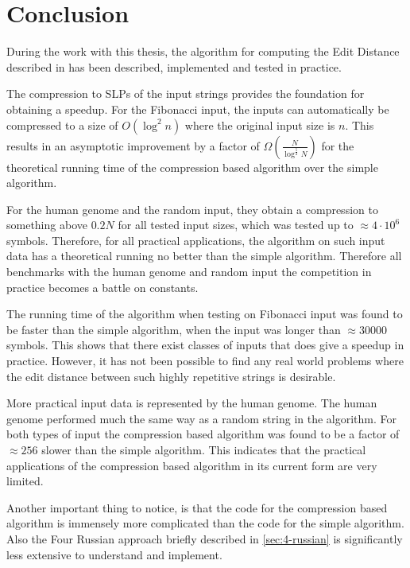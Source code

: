 \documentclass[twoside,11pt,openright]{report}
\begin{document}
\chapter{Conclusion}
\label{chapter:conclusion}
During the work with this thesis, the algorithm for computing the Edit Distance described in \cite{Gawrychowski:2012:FAC:2422024.2422048} has been described, implemented and tested in practice.

The compression to SLPs of the input strings provides the foundation for obtaining a speedup. For the Fibonacci input, the inputs can automatically be compressed to a size of $O(\log^2{n})$ where the original input size is $n$. This results in an asymptotic improvement by a factor of $\Omega\left( \frac{N}{\log^{\frac{5}{2}}{N}} \right)$ for the theoretical running time of the compression based algorithm over the simple algorithm.

For the human genome and the random input, they obtain a compression to something above $0.2N$ for all tested input sizes, which was tested up to $\approx 4\cdot 10^6$ symbols. Therefore, for all practical applications, the algorithm on such input data has a theoretical running no better than the simple algorithm. Therefore all benchmarks with the human genome and random input the competition in practice becomes a battle on constants.

The running time of the algorithm when testing on Fibonacci input was found to be faster than the simple algorithm, when the input was longer than $\approx 30000$ symbols. This shows that there exist classes of inputs that does give a speedup in practice. However, it has not been possible to find any real world problems where the edit distance between such highly repetitive strings is desirable.

More practical input data is represented by the human genome. The human genome performed much the same way as a random string in the algorithm. For both types of input the compression based algorithm was found to be a factor of $\approx 256$ slower than the simple algorithm. This indicates that the practical applications of the compression based algorithm in its current form are very limited.

Another important thing to notice, is that the code for the compression based algorithm is immensely more complicated than the code for the simple algorithm. Also the Four Russian approach briefly described in \cref{sec:4-russian} is significantly less extensive to understand and implement.
\end{document}
